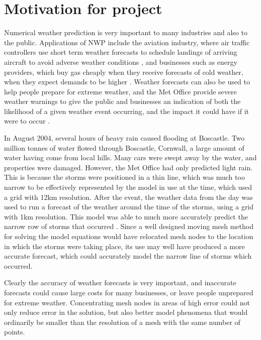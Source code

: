  \section{Motivation for project}\label{sec:motiv}
 Numerical weather prediction is very important to many industries and also to the public. Applications of NWP include the aviation industry, where air traffic controllers use short term weather forecasts to schedule landings of arriving aircraft to avoid adverse weather conditions \parencite{committee95}, and businesses such as energy providers, which buy gas cheaply when they receive forecasts of cold weather, when they expect demands to be higher \parencite{inness12}. Weather forecasts can also be used to help people prepare for extreme weather, and the Met Office provide severe weather warnings to give the public and businesses an indication of both the likelihood of a given weather event occurring, and the impact it could have if it were to occur \parencite{weatherwarn}. 
 
In August 2004, several hours of heavy rain caused flooding at Boscastle. Two million tonnes of water flowed through Boscastle, Cornwall, a large amount of water having come from local hills. Many cars were swept away by the water, and properties were damaged. However, the Met Office had only predicted light rain. This is because the storms were positioned in a thin line, which was much too narrow to be effectively represented by the model in use at the time, which used a grid with 12km resolution. After the event, the weather data from the day was used to run a forecast of the weather around the time of the storms, using a grid with 1km resolution. This model was able to much more accurately predict the narrow row of storms that occurred \parencite{metboscastle}. Since a well designed moving mesh method for solving the model equations would have relocated mesh nodes to the location in which the storms were taking place, its use may well have produced a more accurate forecast, which could accurately model the narrow line of storms which occurred.

Clearly the accuracy of weather forecasts is very important, and inaccurate forecasts could cause large costs for many businesses, or leave people unprepared for extreme weather. Concentrating mesh nodes in areas of high error could not only reduce error in the solution, but also better model phenomena that would ordinarily be smaller than the resolution of a mesh with the same number of points.


